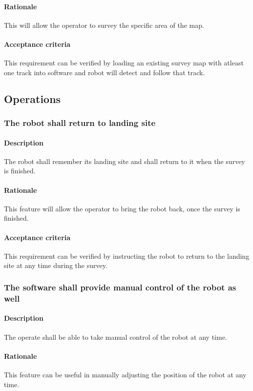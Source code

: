 \documentclass[10pt,a4paper,titlepage]{article}
\begin{document}
    \paragraph{Rationale}   This will allow the operator to survey the specific area of the map.
    \paragraph{Acceptance criteria}   This requirement can be verified by loading an existing survey map with atleast one track into software and robot will detect and follow that track.
	\subsection{Operations}
    \subsubsection{The robot shall return to landing site}
     \paragraph{Description}   The robot shall remember its landing site and shall return to it when the survey is finished.
    \paragraph{Rationale}   This feature will allow the operator to bring the robot back, once the survey is finished.
    \paragraph{Acceptance criteria}   This requirement can be verified by instructing the robot to return to the landing site at any time during the survey.
    \subsubsection{The software shall provide manual control of the robot as well}
     \paragraph{Description}   The operate shall be able to take manual control of the robot at any time. 
    \paragraph{Rationale}   This feature can be useful in manually adjusting the position of the robot at any time.
\end{document}
